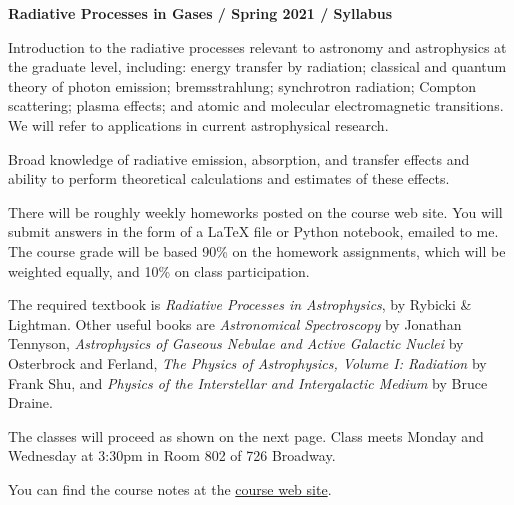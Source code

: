 \documentclass[12pt]{article}
\begin{document}
\begin{center}
  {\bf Radiative Processes in Gases / Spring 2021 / Syllabus }
\end{center}


 Introduction to the radiative
processes relevant to astronomy and astrophysics at the graduate
level, including: energy transfer by radiation; classical and quantum
theory of photon emission; bremsstrahlung; synchrotron radiation;
Compton scattering; plasma effects; and atomic and molecular
electromagnetic transitions.  We will refer to applications in current
astrophysical research.

 Broad knowledge of radiative
emission, absorption, and transfer effects and ability to perform
theoretical calculations and estimates of these effects.

 There will be roughly weekly homeworks
posted on the course web site.  You will submit answers in the form of
a LaTeX file or Python notebook, emailed to me. The course grade will
be based 90\% on the homework assignments, which will be
weighted equally, and 10\% on class participation.

 The required textbook is {\it Radiative
  Processes in Astrophysics}, by Rybicki \& Lightman. Other useful
books are {\it Astronomical Spectroscopy} by Jonathan Tennyson, {\it
  Astrophysics of Gaseous Nebulae and Active Galactic Nuclei} by
Osterbrock and Ferland, {\it The Physics of Astrophysics, Volume
  I: Radiation} by Frank Shu, and {\it Physics of the Interstellar and
  Intergalactic Medium} by Bruce Draine.

\noindent The classes will proceed as shown on the next page.  Class
meets Monday and Wednesday at 3:30pm in Room 802 of 726 Broadway.

\noindent You can find the course notes at the
\href{https://github.com/blanton144/radiative/tree/main/docs/pdf}{course
web site}. 

\end{document}
